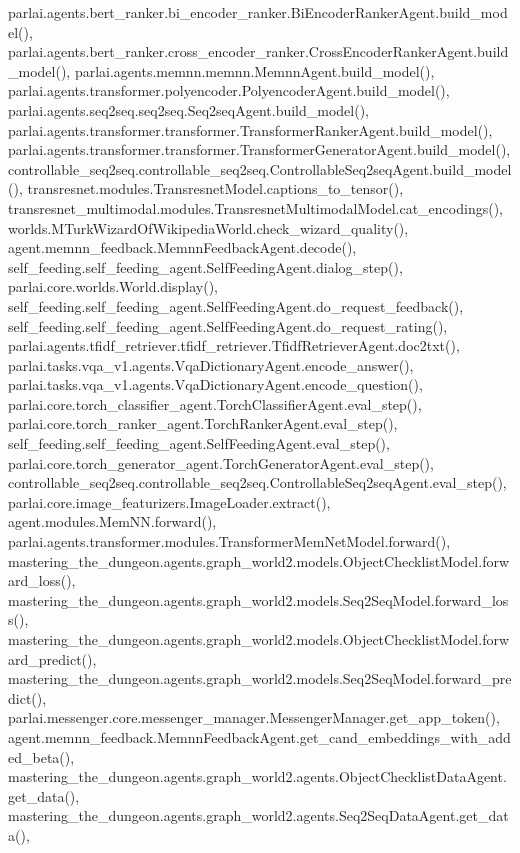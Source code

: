 parlai.\+agents.\+bert\+\_\+ranker.\+bi\+\_\+encoder\+\_\+ranker.\+Bi\+Encoder\+Ranker\+Agent.\+build\+\_\+model(), parlai.\+agents.\+bert\+\_\+ranker.\+cross\+\_\+encoder\+\_\+ranker.\+Cross\+Encoder\+Ranker\+Agent.\+build\+\_\+model(), parlai.\+agents.\+memnn.\+memnn.\+Memnn\+Agent.\+build\+\_\+model(), parlai.\+agents.\+transformer.\+polyencoder.\+Polyencoder\+Agent.\+build\+\_\+model(), parlai.\+agents.\+seq2seq.\+seq2seq.\+Seq2seq\+Agent.\+build\+\_\+model(), parlai.\+agents.\+transformer.\+transformer.\+Transformer\+Ranker\+Agent.\+build\+\_\+model(), parlai.\+agents.\+transformer.\+transformer.\+Transformer\+Generator\+Agent.\+build\+\_\+model(), controllable\+\_\+seq2seq.\+controllable\+\_\+seq2seq.\+Controllable\+Seq2seq\+Agent.\+build\+\_\+model(), transresnet.\+modules.\+Transresnet\+Model.\+captions\+\_\+to\+\_\+tensor(), transresnet\+\_\+multimodal.\+modules.\+Transresnet\+Multimodal\+Model.\+cat\+\_\+encodings(), worlds.\+M\+Turk\+Wizard\+Of\+Wikipedia\+World.\+check\+\_\+wizard\+\_\+quality(), agent.\+memnn\+\_\+feedback.\+Memnn\+Feedback\+Agent.\+decode(), self\+\_\+feeding.\+self\+\_\+feeding\+\_\+agent.\+Self\+Feeding\+Agent.\+dialog\+\_\+step(), parlai.\+core.\+worlds.\+World.\+display(), self\+\_\+feeding.\+self\+\_\+feeding\+\_\+agent.\+Self\+Feeding\+Agent.\+do\+\_\+request\+\_\+feedback(), self\+\_\+feeding.\+self\+\_\+feeding\+\_\+agent.\+Self\+Feeding\+Agent.\+do\+\_\+request\+\_\+rating(), parlai.\+agents.\+tfidf\+\_\+retriever.\+tfidf\+\_\+retriever.\+Tfidf\+Retriever\+Agent.\+doc2txt(), parlai.\+tasks.\+vqa\+\_\+v1.\+agents.\+Vqa\+Dictionary\+Agent.\+encode\+\_\+answer(), parlai.\+tasks.\+vqa\+\_\+v1.\+agents.\+Vqa\+Dictionary\+Agent.\+encode\+\_\+question(), parlai.\+core.\+torch\+\_\+classifier\+\_\+agent.\+Torch\+Classifier\+Agent.\+eval\+\_\+step(), parlai.\+core.\+torch\+\_\+ranker\+\_\+agent.\+Torch\+Ranker\+Agent.\+eval\+\_\+step(), self\+\_\+feeding.\+self\+\_\+feeding\+\_\+agent.\+Self\+Feeding\+Agent.\+eval\+\_\+step(), parlai.\+core.\+torch\+\_\+generator\+\_\+agent.\+Torch\+Generator\+Agent.\+eval\+\_\+step(), controllable\+\_\+seq2seq.\+controllable\+\_\+seq2seq.\+Controllable\+Seq2seq\+Agent.\+eval\+\_\+step(), parlai.\+core.\+image\+\_\+featurizers.\+Image\+Loader.\+extract(), agent.\+modules.\+Mem\+N\+N.\+forward(), parlai.\+agents.\+transformer.\+modules.\+Transformer\+Mem\+Net\+Model.\+forward(), mastering\+\_\+the\+\_\+dungeon.\+agents.\+graph\+\_\+world2.\+models.\+Object\+Checklist\+Model.\+forward\+\_\+loss(), mastering\+\_\+the\+\_\+dungeon.\+agents.\+graph\+\_\+world2.\+models.\+Seq2\+Seq\+Model.\+forward\+\_\+loss(), mastering\+\_\+the\+\_\+dungeon.\+agents.\+graph\+\_\+world2.\+models.\+Object\+Checklist\+Model.\+forward\+\_\+predict(), mastering\+\_\+the\+\_\+dungeon.\+agents.\+graph\+\_\+world2.\+models.\+Seq2\+Seq\+Model.\+forward\+\_\+predict(), parlai.\+messenger.\+core.\+messenger\+\_\+manager.\+Messenger\+Manager.\+get\+\_\+app\+\_\+token(), agent.\+memnn\+\_\+feedback.\+Memnn\+Feedback\+Agent.\+get\+\_\+cand\+\_\+embeddings\+\_\+with\+\_\+added\+\_\+beta(), mastering\+\_\+the\+\_\+dungeon.\+agents.\+graph\+\_\+world2.\+agents.\+Object\+Checklist\+Data\+Agent.\+get\+\_\+data(), mastering\+\_\+the\+\_\+dungeon.\+agents.\+graph\+\_\+world2.\+agents.\+Seq2\+Seq\+Data\+Agent.\+get\+\_\+data(), 